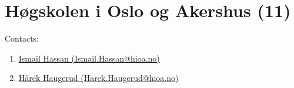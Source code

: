 \section{Høgskolen i Oslo og Akershus (11)}
\label{sec:HiOA}

Contacts:\begin{enumerate}
 \item {}\href{mailto:Ismail.Hassan@hioa.no}{Ismail Hassan (Ismail.Hassan@hioa.no)}
 \item {}\href{mailto:Harek.Haugerud@hioa.no}{Hårek Haugerud (Harek.Haugerud@hioa.no)}
\end{enumerate}

